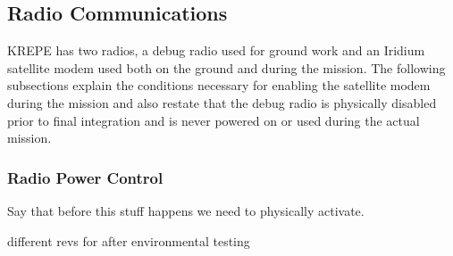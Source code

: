\documentclass{article}
\begin{document}
%    

\subsection{Radio Communications}

KREPE has two radios, a debug radio used for ground work and an Iridium satellite modem used both on the ground and during the mission. The following subsections explain the conditions necessary for enabling the satellite modem during the mission and also restate that the debug radio is physically disabled prior to final integration and is never powered on or used during the actual mission.

\subsubsection{Radio Power Control}
\label{sec:radio-power-control}
Say that before this stuff happens we need to physically activate.

different revs for after environmental testing
\end{document}
